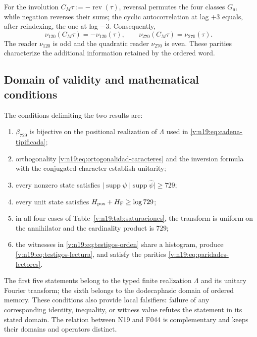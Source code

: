 For the involution \(C_M\tau:=-\operatorname{rev}(\tau)\), reversal
permutes the four classes \(G_a\), while negation reverses their sums;
the cyclic autocorrelation at lag \(+3\) equals, after reindexing, the one
at lag \(-3\). Consequently,
\begin{equation}
 \nu_{120}(C_M\tau)=-\nu_{120}(\tau),\qquad
 \nu_{270}(C_M\tau)=\nu_{270}(\tau).
 \label{v:n19:eq:paridades-lectores}
\end{equation}
The reader \(\nu_{120}\) is odd and the quadratic reader \(\nu_{270}\) is
even. These parities characterize the additional information retained by
the ordered word.

\subsection{Domain of validity and mathematical conditions}
\label{v:n19:sec:falsadores}

The conditions delimiting the two results are:
\begin{enumerate}
 \item \(\beta_{729}\) is bijective on the positional realization of
 \(\Lambda\) used in \eqref{v:n19:eq:cadena-tipificada};
 \item orthogonality \eqref{v:n19:eq:ortogonalidad-caracteres} and the
 inversion formula with the conjugated character establish unitarity;
 \item every nonzero state satisfies
 \(\lvert\operatorname{supp}\psi\rvert
 \lvert\operatorname{supp}\widehat\psi\rvert\ge729\);
 \item every unit state satisfies
 \(H_{\rm pos}+H_{\rm F}\ge\log729\);
 \item in all four cases of
 Table~\ref{v:n19:tab:saturaciones}, the transform is uniform on the
 annihilator and the cardinality product is \(729\);
 \item the witnesses in \eqref{v:n19:eq:testigos-orden} share a
 histogram, produce \eqref{v:n19:eq:testigos-lectura}, and satisfy the
 parities \eqref{v:n19:eq:paridades-lectores}.
\end{enumerate}
The first five statements belong to the typed finite realization
\(\Lambda\) and its unitary Fourier transform; the sixth belongs to the
dodecaphasic domain of ordered memory. These conditions also provide local
falsifiers: failure of any corresponding identity, inequality, or witness
value refutes the statement in its stated domain. The relation between
N19 and F044 is complementary and keeps their domains and operators
distinct.
